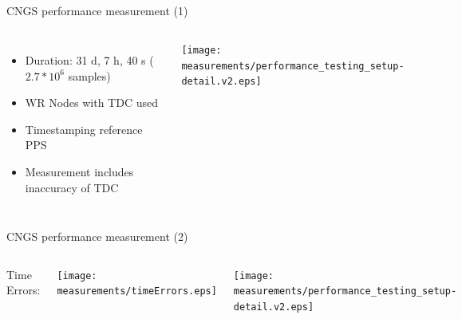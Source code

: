 \documentclass[compress,red]{beamer}
\begin{document}
\subsection{}
\begin{frame}{CNGS performance measurement (1)}

  \begin{columns}[c]
	  \begin{itemize}
		\item Duration: 31 d, 7 h, 40 s ($2.7*10^6$ samples)
		\item WR Nodes with TDC used
		\item Timestamping reference PPS
		\item Measurement includes inaccuracy of TDC
	  \end{itemize}
		\begin{center}
		\texttt{[image: measurements/performance\_testing\_setup-detail.v2.eps]}
		\end{center}
  \end{columns}


\end{frame}
\begin{frame}{CNGS performance measurement (2)}

  \begin{columns}[c]
	  \begin{center}
	  Time Errors:
	  \end{center}
	  \begin{center}
	\texttt{[image: measurements/timeErrors.eps]}
	  \end{center}
		\begin{center}
		\texttt{[image: measurements/performance\_testing\_setup-detail.v2.eps]}
		
		\end{center}
  \end{columns}


\end{frame}
\end{document}
